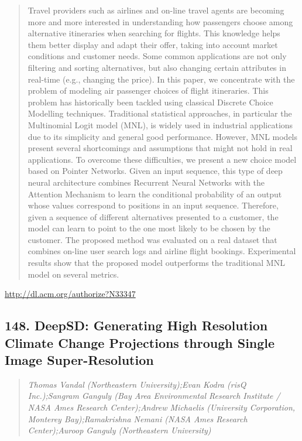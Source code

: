 \documentclass{article}
\begin{document}
\begin{quote}
Travel providers such as airlines and on-line travel agents are becoming more and more interested in understanding how passengers choose among alternative itineraries when searching for flights. This knowledge helps them better display and adapt their offer, taking into account market conditions and customer needs. Some common applications are not only filtering and sorting alternatives, but also changing certain attributes in real-time (e.g., changing the price). In this paper, we concentrate with the problem of modeling air passenger choices of flight itineraries. This problem has historically been tackled using classical Discrete Choice Modelling techniques. Traditional statistical approaches, in particular the Multinomial Logit model (MNL), is widely used in industrial applications due to its simplicity and general good performance. However, MNL models present several shortcomings and assumptions that might not hold in real applications. To overcome these difficulties, we present a new choice model based on Pointer Networks. Given an input sequence, this type of deep neural architecture combines Recurrent Neural Networks with the Attention Mechanism to learn the conditional probability of an output whose values correspond to positions in an input sequence. Therefore, given a sequence of different alternatives presented to a customer, the model can learn to point to the one most likely to be chosen by the customer. The proposed method was evaluated on a real dataset that combines on-line user search logs and airline flight bookings. Experimental results show that the proposed model outperforms the traditional MNL model on several metrics.
\end{quote}

\href{http://dl.acm.org/authorize?N33347}{http://dl.acm.org/authorize?N33347}

\subsection{148. DeepSD: Generating High Resolution Climate Change Projections through Single Image Super-Resolution}

\begin{quote}
\footnotesize{\textit{Thomas Vandal (Northeastern University);Evan Kodra (risQ Inc.);Sangram Ganguly (Bay Area Environmental Research Institute / NASA Ames Research Center);Andrew Michaelis (University Corporation, Monterey Bay);Ramakrishna Nemani (NASA Ames Research Center);Auroop Ganguly (Northeastern University)}}

\end{quote}
\end{document}
